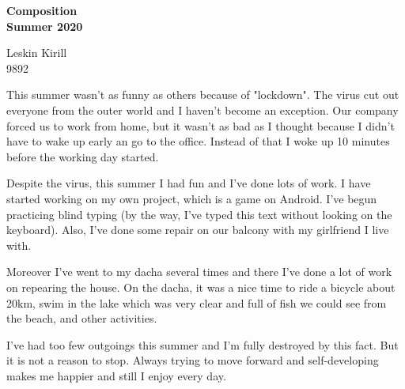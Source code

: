 \documentclass[12pt,a4paper]{article}%
\begin{document}
\begin{center}
	\large{\textbf{Composition\\Summer 2020}}
	\begin{flushright}
		Leskin Kirill \\
		9892
	\end{flushright}
\end{center}

This summer wasn't as funny as others because of "lockdown". The virus cut out everyone from the outer world and I haven't become an exception. Our company forced us to work from home, but it wasn't as bad as I thought because I didn't have to wake up early an go to the office. Instead of that I woke up 10 minutes before the working day started.

Despite the virus, this summer I had fun and I've done lots of work. I have started working on my own project, which is a game on Android. I've begun practicing blind typing (by the way, I've typed this text without looking on the keyboard). Also, I've done some repair on our balcony with my girlfriend I live with.

Moreover I've went to my dacha several times and there I've done a lot of work on repearing the house. On the dacha, it was a nice time to ride a bicycle about 20km, swim in the lake which was very clear and full of fish we could see from the beach, and other activities.

I've had too few outgoings this summer and I'm fully destroyed by this fact. But it is not a reason to stop. Always trying to move forward and self-developing makes me happier and still I enjoy every day.
\end{document}
